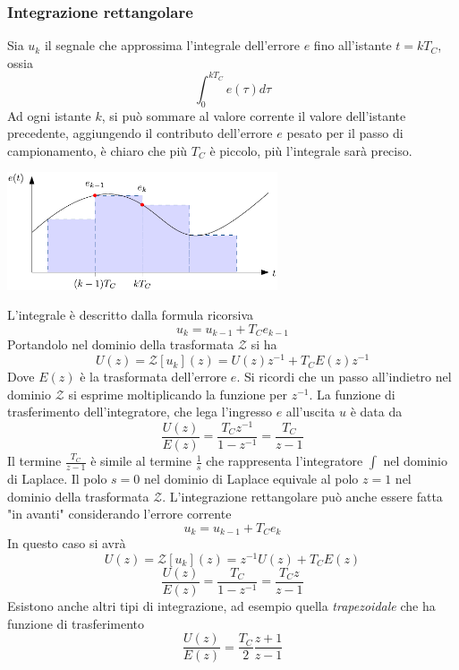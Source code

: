 \documentclass[10pt, letterpaper]{report}
\begin{document}
\subsubsection{Integrazione rettangolare}
Sia $u_k$ il segnale che approssima l'integrale dell'errore $e$ fino all'istante $t=kT_C$, ossia 
$$ \int_0^{kT_C} e(\tau)d\tau$$
Ad ogni istante $k$, si può sommare al valore corrente il valore dell'istante precedente, aggiungendo il contributo dell'errore $e$ pesato per il passo di campionamento, è chiaro che più $T_C$ è piccolo, più l'integrale sarà preciso.
\begin{center}
    \includegraphics[width=0.6\textwidth]{images/integraleRett.pdf}
\end{center}
L'integrale è descritto dalla formula ricorsiva 
$$u_k=u_{k-1}+T_Ce_{k-1} $$
Portandolo nel dominio della trasformata $\mathcal{Z}$ si ha 
$$ U(z)=\mathcal{Z}[u_k](z)=U(z)z^{-1}+T_CE(z)z^{-1}$$
Dove $E(z)$ è la trasformata dell'errore $e$. Si ricordi che un passo all'indietro nel dominio $\mathcal{Z}$ si esprime moltiplicando la funzione per $z^{-1}$. \acc 
La funzione di trasferimento dell'integratore, che lega l'ingresso $e$ all'uscita $u$ è data da 
$$ \frac{U(z)}{E(z)}=\frac{T_Cz^{-1}}{1-z^{-1}}=\frac{T_C}{z-1}$$
Il termine $\frac{T_C}{z-1}$ è simile al termine $\frac{1}{s}$ che rappresenta l'integratore $\int$ nel dominio di Laplace. Il polo $s=0$ nel dominio di Laplace equivale al polo $z=1$ nel dominio della trasformata $\mathcal{Z}$.\acc 
L'integrazione rettangolare può anche essere fatta "in avanti" considerando l'errore corrente 
$$u_k=u_{k-1}+T_Ce_{k} $$
In questo caso si avrà 
$$ U(z)=\mathcal{Z}[u_k](z)=z^{-1}U(z)+T_CE(z)$$
$$ \frac{U(z)}{E(z)}=\frac{T_C}{1-z^{-1}}=\frac{T_Cz}{z-1}$$
Esistono anche altri tipi di integrazione, ad esempio quella \textit{trapezoidale} che ha funzione di trasferimento 
$$ \frac{U(z)}{E(z)}=\frac{T_C}{2}\frac{z+1}{z-1}$$
\end{document}
